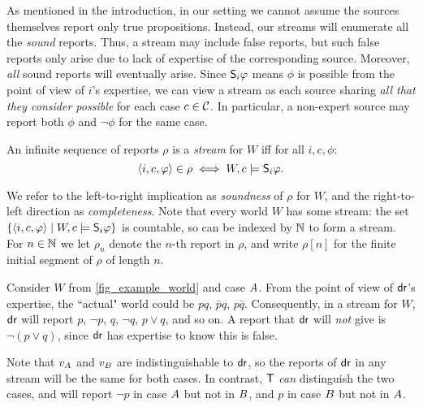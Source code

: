 As mentioned in the introduction, in our setting we cannot assume the sources
themselves report only true propositions. Instead, our streams will enumerate
all the \emph{sound} reports. Thus, a stream may include false reports, but
such false reports only arise due to lack of expertise of the corresponding
source.\footnotemark{} Moreover, \emph{all} sound reports will eventually
arise. Since $\S_i\phi$ means $\phi$ is possible from the point of view of
$i$'s expertise, we can view a stream as each source sharing \emph{all that
they consider possible} for each case $c \in \css$. In particular, a non-expert
source may report both $\phi$ and $\neg\phi$ for the same case.


\begin{definition}
    \label{def_stream}
    An infinite sequence of reports $\rho$ is a \emph{stream} for $W$ iff for
    all $i, c, \phi$:
    \[
        \tuple{i, c, \phi} \in \rho \iff W, c \models \S_i\phi.
    \]
\end{definition}

We refer to the left-to-right implication as \emph{soundness} of $\rho$ for
$W$, and the right-to-left direction as \emph{completeness}. Note that every
world $W$ has some stream: the set $\{\tuple{i, c, \phi} \mid W, c \models
\S_i\phi\}$ is countable, so can be indexed by $\N$ to form a stream. For $n
\in \N$ we let $\rho_n$ denote the $n$-th report in $\rho$, and write $\rho[n]$
for the finite initial segment of $\rho$ of length $n$.

\begin{example}
    \label{ex_stream}
    Consider $W$ from \cref{fig_example_world} and case $\patientA{}$. From the
    point of view of $\dr{}$'s expertise, the ``actual" world could be $pq$,
    $\bar{p}q$, $p\bar{q}$. Consequently, in a stream for $W$, $\dr{}$ will
    report $p$, $\neg p$, $q$, $\neg q$, $p \lor q$, and so on. A report that
    $\dr{}$ will \emph{not} give is $\neg (p \lor q)$, since $\dr{}$ has
    expertise to know this is false.

    Note that $v_{\patientA{}}$ and $v_{\patientB{}}$ are indistinguishable to
    $\dr{}$, so the reports of $\dr{}$ in any stream will be the same for both
    cases. In contrast, $\tech{}$ \emph{can} distinguish the two cases, and
    will report $\neg p$ in case $\patientA{}$ but not in $\patientB{}$, and
    $p$ in case $\patientB{}$ but not in $\patientA{}$.
\end{example}

